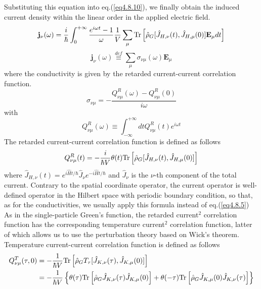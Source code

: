 Substituting this equation into eq.(\ref{eq4.8.10}), we finally obtain the induced current density within the linear order in the applied electric field.
\begin{equation}
\mathbf j_\nu(\omega)=\frac{i}{\hbar}\int_0^{+\infty} \frac{e^{i\omega t}-1}{\omega}\frac{1}{V} \sum_\mu \text{Tr} \left[ \hat \rho_G[\hat J_{H,\nu}(t),\hat J_{H,\mu}(0)] \mathbf E_\mu dt \right]
\end{equation}
\begin{equation}
\mathbf j_\nu (\omega)\overset{def}{\equiv} \sum_\mu \sigma_{\nu\mu}(\omega)\mathbf E_\mu
\end{equation}
where the conductivity is given by the retarded current-current correlation function.
\begin{equation}
\sigma_{\nu\mu}=-\frac{Q^R_{\nu\mu}(\omega)-Q^R_{\nu\mu}(0)}{i\omega}
\end{equation}
with
\begin{equation}
Q^R_{\nu\mu}(\omega)\equiv \int_{-\infty}^{+\infty} dt Q^R_{\nu\mu}(t)e^{i\omega t}
\end{equation}
 The retarded current-current correlation function is defined as follows
\begin{equation}
Q^R_{\nu\mu}(t)=-\frac{i}{\hbar V}\theta(t)\text{Tr} \left[ \hat \rho_G[\hat J_{H,\nu}(t),\hat J_{H,\mu}(0)] \right]
\end{equation}
 where $\hat J_{H,\nu}(t)=e^{i\hat Ht/\hbar} \hat J_\nu e^{-i\hat Ht/\hbar}$ and $\hat J_\nu$ is the $\nu$-th component of the total current.
 Contrary to the spatial coordinate operator, the current operator is well-defined operator in the Hilbert space with periodic boundary condition, so that, as for the conductivities, we usually apply this formula instead of eq.(\ref{eq4.8.5})
 As in the single-particle Green's function, the retarded current$^2$ correlation function has the corresponding temperature current$^2$ correlation function, latter of which allows us to use the perturbation theory based on Wick's theorem.
 Temperature current-current correlation function is defined as follows
\begin{equation}
\begin{aligned}
Q^T_{\nu\mu}(\tau,0)&=-\frac{1}{\hbar V} \text{Tr} \left[ \hat \rho_G T_\tau[\hat J_{K,\nu}(\tau),\hat J_{K,\mu}(0)] \right]\\
&=-\frac{1}{\hbar V}\left\{ \theta(\tau) \text{Tr}\left[ \hat \rho_G \hat J_{K,\nu}(\tau) \hat J_{K,\mu}(0) \right] + \theta(-\tau) \text{Tr}\left[ \hat \rho_G \hat J_{K,\mu}(0) \hat J_{K,\nu}(\tau) \right]\right\}
\end{aligned}
\end{equation}
